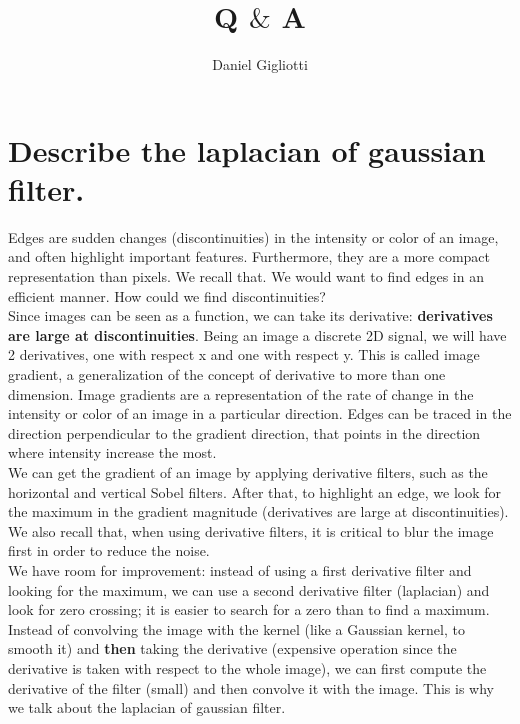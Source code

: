 \documentclass{article}
\title{Q $\&$ A}
\author{Daniel Gigliotti}
\date{}
\begin{document}
\maketitle

\newpage

\section{Describe the laplacian of gaussian filter.}

Edges are sudden changes (discontinuities) in the intensity or color of an image, and often highlight important features. Furthermore, they are a more compact representation than pixels. We recall that. We would want to find edges in an efficient manner. How could we find discontinuities? \\

Since images can be seen as a function, we can take its derivative: \textbf{derivatives are large at discontinuities}. Being an image a discrete 2D signal, we will have 2 derivatives, one with respect x and one with respect y. This is called image gradient, a generalization of the concept of derivative to more than one dimension. Image gradients are a representation of the rate of change in the intensity or color of an image in a particular direction. Edges can be traced in the direction perpendicular to the gradient direction, that points in the direction where intensity increase the most. \\

We can get the gradient of an image by applying derivative filters, such as the horizontal and vertical Sobel filters. After that, to highlight an edge, we look for the maximum in the gradient magnitude (derivatives are large at discontinuities). We also recall that, when using derivative filters, it is critical to blur the image first in order to reduce the noise. \\

We have room for improvement: instead of using a first derivative filter and looking for the maximum, we can use a second derivative filter (laplacian) and look for zero crossing; it is easier to search for a zero than to find a maximum. Instead of convolving the image with the kernel (like a Gaussian kernel, to smooth it) and \textbf{then} taking the derivative (expensive operation since the derivative is taken with respect to the whole image), we can first compute the derivative of the filter (small) and then convolve it with the image. This is why we talk about the laplacian of gaussian filter. \\
\end{document}
